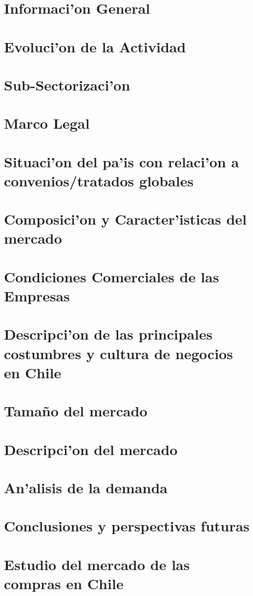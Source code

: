 \documentclass[letterpaper,openright,10pt,oneside]{report}
\begin{document}
		\section{Informaci'on General}
		\section{Evoluci'on de la Actividad}
		\section{Sub-Sectorizaci'on}
		\section{Marco Legal}
		\section{Situaci'on del pa'is con relaci'on a convenios/tratados globales}
		\section{Composici'on y Caracter'isticas del mercado}
		\section{Condiciones Comerciales de las Empresas}
		\section{Descripci'on de las principales costumbres y cultura de negocios en Chile}
		\section{Tamaño del mercado}
		\section{Descripci'on del mercado}
		\section{An'alisis de la demanda}
		\section{Conclusiones y perspectivas futuras}
		\section{Estudio del mercado de las compras en Chile}
\end{document}
